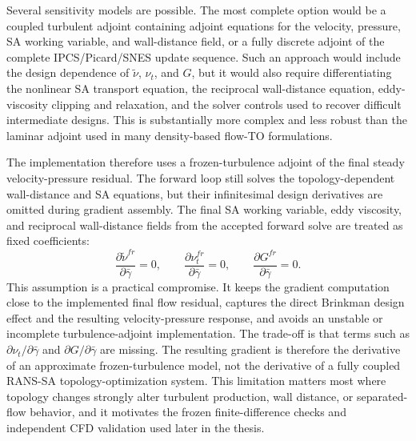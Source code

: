 Several sensitivity models are possible. The most complete option would be a coupled turbulent adjoint containing adjoint equations for the velocity, pressure, SA working variable, and wall-distance field, or a fully discrete adjoint of the complete IPCS/Picard/SNES update sequence. Such an approach would include the design dependence of $\tilde{\nu}$, $\nu_t$, and $G$, but it would also require differentiating the nonlinear SA transport equation, the reciprocal wall-distance equation, eddy-viscosity clipping and relaxation, and the solver controls used to recover difficult intermediate designs. This is substantially more complex and less robust than the laminar adjoint used in many density-based flow-TO formulations.

The implementation therefore uses a frozen-turbulence adjoint of the final steady velocity-pressure residual. The forward loop still solves the topology-dependent wall-distance and SA equations, but their infinitesimal design derivatives are omitted during gradient assembly. The final SA working variable, eddy viscosity, and reciprocal wall-distance fields from the accepted forward solve are treated as fixed coefficients:
\begin{equation}
	\frac{\partial \tilde{\nu}^{fr}}{\partial\bar{\gamma}} = 0,
	\qquad
	\frac{\partial \nu_t^{fr}}{\partial\bar{\gamma}} = 0,
	\qquad
	\frac{\partial G^{fr}}{\partial\bar{\gamma}} = 0 .
	\label{eq:frozen_turbulence_derivatives}
\end{equation}
This assumption is a practical compromise. It keeps the gradient computation close to the implemented final flow residual, captures the direct Brinkman design effect and the resulting velocity-pressure response, and avoids an unstable or incomplete turbulence-adjoint implementation. The trade-off is that terms such as $\partial\nu_t/\partial\bar{\gamma}$ and $\partial G/\partial\bar{\gamma}$ are missing. The resulting gradient is therefore the derivative of an approximate frozen-turbulence model, not the derivative of a fully coupled RANS-SA topology-optimization system. This limitation matters most where topology changes strongly alter turbulent production, wall distance, or separated-flow behavior, and it motivates the frozen finite-difference checks and independent CFD validation used later in the thesis.

